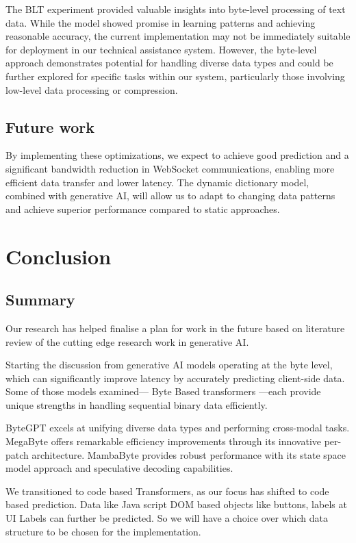 \documentclass[a4paper, 11pt, twoside, openright]{report}
\begin{document}
The BLT experiment provided valuable insights into byte-level processing of text data. While the model showed promise in learning patterns and achieving reasonable accuracy, the current implementation may not be immediately suitable for deployment in our technical assistance system. However, the byte-level approach demonstrates potential for handling diverse data types and could be further explored for specific tasks within our system, particularly those involving low-level data processing or compression.


\section{Future work}
By implementing these optimizations, we expect to achieve good prediction and a significant bandwidth reduction in WebSocket communications, enabling more efficient data transfer and lower latency. The dynamic dictionary model, combined with generative AI, will allow us to adapt to changing data patterns and achieve superior performance  compared to static approaches.



\chapter{Conclusion }
\section{Summary}
Our research has helped finalise a plan for work in the future based on literature review of the cutting edge research work in generative AI. 

Starting the discussion from generative AI models operating at the byte level, which can significantly improve latency by accurately predicting client-side data. Some of those models examined— Byte Based transformers —each provide unique strengths in handling sequential binary data efficiently.

ByteGPT excels at unifying diverse data types and performing cross-modal tasks. MegaByte offers remarkable efficiency improvements through its innovative per-patch architecture. MambaByte provides robust performance with its state space model approach and speculative decoding capabilities.

We transitioned to code based Transformers, as our focus has shifted to code based prediction. Data like Java script DOM based objects like buttons, labels at UI Labels can further be predicted. So we will have a choice over which data structure to be chosen for the implementation.
\end{document}
